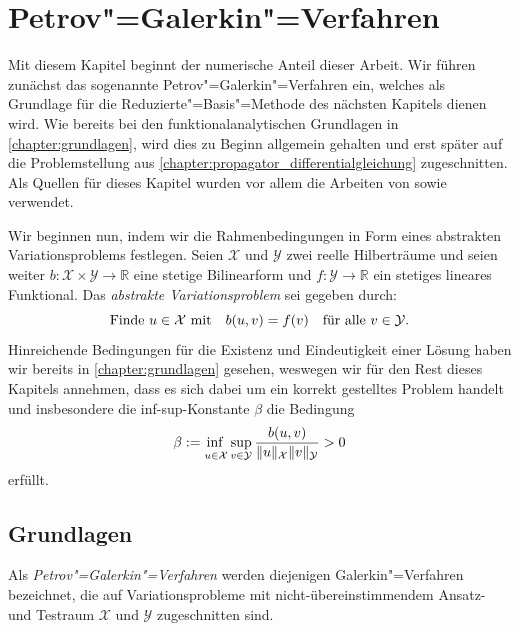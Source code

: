 \documentclass[../main.tex]{subfiles}
\begin{document}
\chapter{Petrov"=Galerkin"=Verfahren} %
\label{chapter:galerkin}

Mit diesem Kapitel beginnt der numerische Anteil dieser Arbeit.
Wir führen zunächst das sogenannte Petrov"=Galerkin"=Verfahren ein, welches als Grundlage für die Reduzierte"=Basis"=Methode des nächsten Kapitels dienen wird.
Wie bereits bei den funktionalanalytischen Grundlagen in \cref{chapter:grundlagen}, wird dies zu Beginn allgemein gehalten und erst später auf die Problemstellung aus \cref{chapter:propagator_differentialgleichung} zugeschnitten.
Als Quellen für dieses Kapitel wurden vor allem die Arbeiten von \textcite{Nochetto:2009il} sowie \textcite{Braess:2007wm} verwendet.

Wir beginnen nun, indem wir die Rahmenbedingungen in Form eines abstrakten Variationsproblems festlegen.
Seien $\mathcal X$ und $\mathcal Y$ zwei reelle Hilberträume und seien weiter $b \colon \mathcal X \times \mathcal Y \to \mathbb{R}$ eine stetige Bilinearform und $f \colon \mathcal Y \to \mathbb{R}$ ein stetiges lineares Funktional.
Das \emph{abstrakte Variationsproblem} sei gegeben durch:
\begin{equation}\label{eq:galerkin_abstraktes_variationsproblem}
    \text{Finde}~u \in \mathcal X \text{ mit} \quad  b(u, v) = f(v) \quad \fa v \in \mathcal Y.
\end{equation}
Hinreichende Bedingungen für die Existenz und Eindeutigkeit einer Lösung haben wir bereits in \cref{chapter:grundlagen} gesehen, weswegen wir für den Rest dieses Kapitels annehmen, dass es sich dabei um ein korrekt gestelltes Problem handelt und insbesondere die inf-sup-Konstante $\beta$ die Bedingung
\begin{equation}\label{eq:galerkin_abstraktes_variationsproblem_infsup_bedingung}
    \beta := \infsup{u \in \mathcal X}{v \in \mathcal Y} \frac{b(u, v)}{\norm{u}_{\mathcal X} \norm{v}_{\mathcal Y}} > 0
\end{equation}
erfüllt.


\section{Grundlagen} %
\label{section:petrov_galerkin_grundlagen}

Als \emph{Petrov"=Galerkin"=Verfahren} werden diejenigen Galerkin"=Verfahren bezeichnet, die auf Variationsprobleme mit nicht-übereinstimmendem Ansatz- und Testraum $\mathcal X$ und $\mathcal Y$ zugeschnitten sind.
\end{document}
